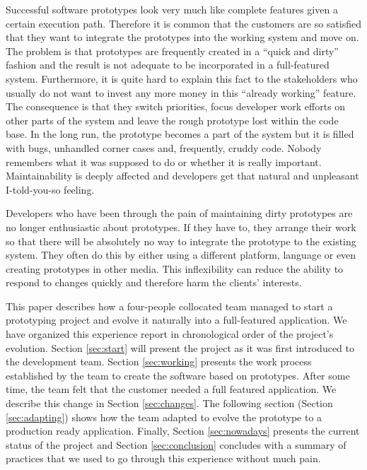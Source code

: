 \documentclass[lnbip]{svmultln}
\begin{document}
Successful software prototypes look very much like complete features
given a certain execution path. Therefore it is common that the
customers are so satisfied that they want to integrate the prototypes
into the working system and move on. The problem is that prototypes
are frequently created in a ``quick and dirty'' fashion and the result
is not adequate to be incorporated in a full-featured
system. Furthermore, it is quite hard to explain this fact to the
stakeholders who usually do not want to invest any more money in this
``already working'' feature. The consequence is that they switch
priorities, focus developer work efforts on other parts of the system
and leave the rough prototype lost within the code base. In the long
run, the prototype becomes a part of the system but it is filled with
bugs, unhandled corner cases and, frequently, cruddy code. Nobody
remembers what it was supposed to do or whether it is really
important. Maintainability is deeply affected and developers get that
natural and unpleasant I-told-you-so feeling. %

Developers who have been through the pain of maintaining dirty
prototypes are no longer enthusiastic about prototypes. If they have
to, they arrange their work so that there will be absolutely no way to
integrate the prototype to the existing system. They often do this by
either using a different platform, language or even creating
prototypes in other media. This inflexibility can reduce the ability
to respond to changes quickly and therefore harm the clients'
interests.

This paper describes how a four-people collocated team managed to
start a prototyping project and evolve it naturally into a
full-featured application.  We have organized this experience report
in chronological order of the project's evolution. Section
\ref{sec:start} will present the project as it was first introduced to
the development team. Section \ref{sec:working} presents the work
process established by the team to create the software based on
prototypes. After some time, the team felt that the customer needed a
full featured application. We describe this change in Section
\ref{sec:changes}. The following section (Section \ref{sec:adapting})
shows how the team adapted to evolve the prototype to a production
ready application. Finally, Section \ref{sec:nowadays} presents the
current status of the project and Section \ref{sec:conclusion}
concludes with a summary of practices that we used to go through this
experience without much pain.
\end{document}
